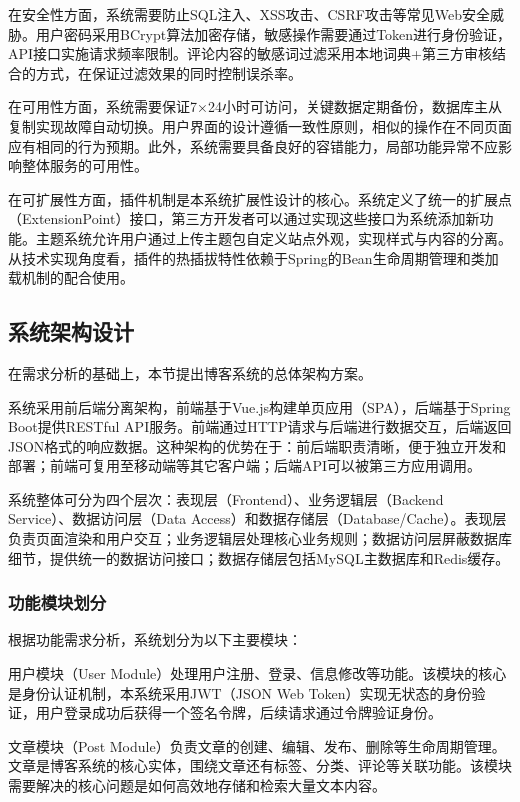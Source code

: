 \documentclass[UTF8,AutoFakeBold=1,AutoFakeSlant,zihao=-4]{SCAU}
\begin{document}
 在安全性方面，系统需要防止SQL注入、XSS攻击、CSRF攻击等常见Web安全威胁。用户密码采用BCrypt算法加密存储，敏感操作需要通过Token进行身份验证，API接口实施请求频率限制。评论内容的敏感词过滤采用本地词典+第三方审核结合的方式，在保证过滤效果的同时控制误杀率{\citep{颉浪鑫2023}}。

 在可用性方面，系统需要保证7×24小时可访问，关键数据定期备份，数据库主从复制实现故障自动切换。用户界面的设计遵循一致性原则，相似的操作在不同页面应有相同的行为预期。此外，系统需要具备良好的容错能力，局部功能异常不应影响整体服务的可用性。

 在可扩展性方面，插件机制是本系统扩展性设计的核心。系统定义了统一的扩展点（ExtensionPoint）接口，第三方开发者可以通过实现这些接口为系统添加新功能。主题系统允许用户通过上传主题包自定义站点外观，实现样式与内容的分离。从技术实现角度看，插件的热插拔特性依赖于Spring的Bean生命周期管理和类加载机制的配合使用{\citep{罗涛2020}}。

 \subsection{系统架构设计}

 在需求分析的基础上，本节提出博客系统的总体架构方案。

 系统采用前后端分离架构，前端基于Vue.js构建单页应用（SPA），后端基于Spring Boot提供RESTful API服务{\citep{Guo2024}}。前端通过HTTP请求与后端进行数据交互，后端返回JSON格式的响应数据。这种架构的优势在于：前后端职责清晰，便于独立开发和部署；前端可复用至移动端等其它客户端；后端API可以被第三方应用调用。

 系统整体可分为四个层次：表现层（Frontend）、业务逻辑层（Backend Service）、数据访问层（Data Access）和数据存储层（Database/Cache）。表现层负责页面渲染和用户交互；业务逻辑层处理核心业务规则；数据访问层屏蔽数据库细节，提供统一的数据访问接口；数据存储层包括MySQL主数据库和Redis缓存。

 \subsubsection{功能模块划分}

 根据功能需求分析，系统划分为以下主要模块：

 用户模块（User Module）处理用户注册、登录、信息修改等功能。该模块的核心是身份认证机制，本系统采用JWT（JSON Web Token）实现无状态的身份验证，用户登录成功后获得一个签名令牌，后续请求通过令牌验证身份。

 文章模块（Post Module）负责文章的创建、编辑、发布、删除等生命周期管理。文章是博客系统的核心实体，围绕文章还有标签、分类、评论等关联功能。该模块需要解决的核心问题是如何高效地存储和检索大量文本内容{\citep{Lyu2025}}。
\end{document}

